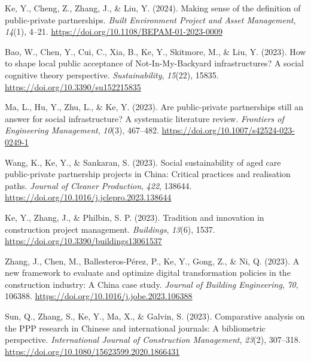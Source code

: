 \documentclass[11pt,a4paper]{report} %
\begin{document}
\begin{tablist}
        \item[2024] \tab{}Ke, Y., Cheng, Z., Zhang, J., \& Liu, Y. (2024). Making sense of the definition of public-private partnerships. \textit{Built Environment Project and Asset Management}, \textit{14}(1), 4--21. \href{https://doi.org/10.1108/BEPAM-01-2023-0009}{https://doi.org/10.1108/BEPAM-01-2023-0009}
        
        \item[2023] \tab{}Bao, W., Chen, Y., Cui, C., Xia, B., Ke, Y., Skitmore, M., \& Liu, Y. (2023). How to shape local public acceptance of Not-In-My-Backyard infrastructures? A social cognitive theory perspective. \textit{Sustainability}, \textit{15}(22), 15835. \href{https://doi.org/10.3390/su152215835}{https://doi.org/10.3390/su152215835}
        
        \item[2023] \tab{}Ma, L., Hu, Y., Zhu, L., \& Ke, Y. (2023). Are public-private partnerships still an answer for social infrastructure? A systematic literature review. \textit{Frontiers of Engineering Management}, \textit{10}(3), 467--482. \href{https://doi.org/10.1007/s42524-023-0249-1}{https://doi.org/10.1007/s42524-023-0249-1}
        
        \item[2023] \tab{}Wang, K., Ke, Y., \& Sankaran, S. (2023). Social sustainability of aged care public-private partnership projects in China: Critical practices and realisation paths. \textit{Journal of Cleaner Production}, \textit{422}, 138644. \href{https://doi.org/10.1016/j.jclepro.2023.138644}{https://doi.org/10.1016/j.jclepro.2023.138644}
        
        \item[2023] \tab{}Ke, Y., Zhang, J., \& Philbin, S. P. (2023). Tradition and innovation in construction project management. \textit{Buildings}, \textit{13}(6), 1537. \href{https://doi.org/10.3390/buildings13061537}{https://doi.org/10.3390/buildings13061537}
        
        \item[2023] \tab{}Zhang, J., Chen, M., Ballesteros-Pérez, P., Ke, Y., Gong, Z., \& Ni, Q. (2023). A new framework to evaluate and optimize digital transformation policies in the construction industry: A China case study. \textit{Journal of Building Engineering}, \textit{70}, 106388. \href{https://doi.org/10.1016/j.jobe.2023.106388}{https://doi.org/10.1016/j.jobe.2023.106388}
        
        \item[2023] \tab{}Sun, Q., Zhang, S., Ke, Y., Ma, X., \& Galvin, S. (2023). Comparative analysis on the PPP research in Chinese and international journals: A bibliometric perspective. \textit{International Journal of Construction Management}, \textit{23}(2), 307--318. \href{https://doi.org/10.1080/15623599.2020.1866431}{https://doi.org/10.1080/15623599.2020.1866431}
        

\end{tablist}
\end{document}

